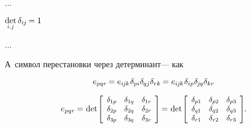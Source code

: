 \begin{otherlanguage}{russian}
...

${
\underset{\raisebox{.12em}{\scalebox{0.7}{$i$,$\hspace{.15ex}j$}}}{\operatorname{det}} \hspace{.4ex} \delta_{i\hspace{-0.1ex}j} \hspace{-0.16ex} = 1
}$

...

\vspace{-0.2em} А~символ перестановки через детерминант\:--- как

\nopagebreak\vspace{-0.2em}\begin{equation*}
e_{pqr} \hspace{-0.2ex}
= e_{i\hspace{-0.1ex}j\hspace{-0.1ex}k} \hspace{.1ex} \delta_{pi} \delta_{\hspace{-0.1ex}qj} \delta_{rk} \hspace{-0.2ex}
= e_{i\hspace{-0.1ex}j\hspace{-0.1ex}k} \hspace{.1ex} \delta_{ip} \delta_{\hspace{-0.15ex}j\hspace{-0.1ex}q} \delta_{kr}
\end{equation*}

\nopagebreak\vspace{-0.1em}\begin{equation}
e_{pqr} \hspace{-0.1ex}
= \hspace{.1ex}
\operatorname{det}\hspace{-0.25ex} \scalebox{0.92}{$\left[ \begin{array}{ccc}
\delta_{1p} & \delta_{1q} & \delta_{1r} \\
\delta_{2p} & \delta_{2q} & \delta_{2r} \\
\delta_{3p} & \delta_{3q} & \delta_{3r}
\end{array} \hspace{-0.1ex} \right]$} \hspace{-0.2ex}
= \hspace{.1ex}
\operatorname{det}\hspace{-0.25ex} \scalebox{0.92}{$\left[ \begin{array}{ccc}
\delta_{p1} & \delta_{p2} & \delta_{p3} \\
\delta_{q1} & \delta_{q2} & \delta_{q3} \\
\delta_{r1} & \delta_{r2} & \delta_{r3}
\end{array} \hspace{-0.1ex} \right]$}
\hspace{-0.2ex} .
\end{equation}




\end{otherlanguage}

